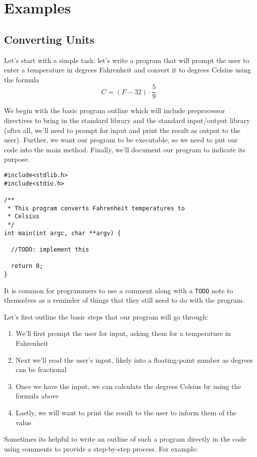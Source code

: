 \section{Examples}

\subsection{Converting Units}

Let's start with a simple task: let's write a program that will prompt the user to enter a temperature
in degrees Fahrenheit and convert it to degrees Celsius using the formula
  $$C = (F - 32) \cdot \frac{5}{9}$$

We begin with the basic program outline which will include preprocessor directives to bring
in the standard library and the standard input/output library (after all, we'll need to prompt
for input and print the result as output to the user).  Further, we want our program to 
be executable, so we need to put our code into the main method.  Finally, we'll document
our program to indicate its purpose.

\begin{verbatim}
#include<stdlib.h>
#include<stdio.h>

/**
 * This program converts Fahrenheit temperatures to 
 * Celsius
 */
int main(int argc, char **argv) {

  //TODO: implement this
  
  return 0;
}
\end{verbatim}

It is common for programmers to use a comment along with a \texttt{TODO} note to
themselves as a reminder of things that they still need to do with the program.  

Let's first outline the basic steps that our program will go through:
\begin{enumerate}
  \item We'll first prompt the user for input, asking them for a temperature in Fahrenheit
  \item Next we'll read the user's input, likely into a floating-point number as degrees can be fractional
  \item Once we have the input, we can calculate the degrees Celsius by using the formula above
  \item Lastly, we will want to print the result to the user to inform them of the value
\end{enumerate}
Sometimes its helpful to write an outline of such a program directly in the code using
comments to provide a step-by-step process.  For example:

